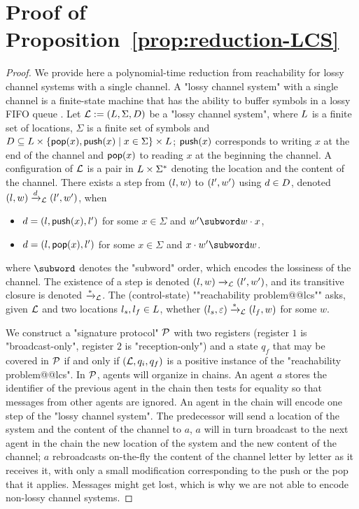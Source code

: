 \section{Proof of Proposition~\ref{prop:reduction-LCS}}
\label{app:reduction-lcs}

\propReductionLCS*
\begin{proof}
	We provide here a polynomial-time reduction from reachability for lossy channel systems with a single channel. A "lossy channel system" with a single channel is a finite-state machine that has the ability to buffer symbols in a lossy FIFO queue \cite{Schnoebelen2002verifying}. 
	Let $\mathcal{L} := (L,\Sigma, D)$ be a "lossy channel system", where $L$ is a finite set of locations, $\Sigma$ is a finite set of symbols and $D \subseteq L \times \{\mathsf{pop}(x), \mathsf{push}(x) \mid x \in \Sigma\} \times L$; $\mathsf{push}(x)$ corresponds to writing $x$ at the end of the channel and $\mathsf{pop}(x)$ to reading $x$ at the beginning the channel. A configuration of $\mathcal{L}$ is a pair in $L \times \Sigma^*$ denoting the location and the content of the channel. There exists a step from $(l,w)$ to $(l',w')$ using $d \in D$, denoted $(l,w) \xrightarrow{d}_{\mathcal{L}} (l',w')$, when
	\begin{itemize}
		\item $d = (l,\mathsf{push}(x),l')$ for some $x \in \Sigma$ and $w' \subword w \cdot x$,
		\item $d = (l,\mathsf{pop}(x),l')$ for some $x \in \Sigma$ and $x \cdot w' \subword w$.
	\end{itemize}
	where $\subword$ denotes the "subword" order, which encodes the lossiness of the channel. 
	The existence of a step is denoted $(l,w) \xrightarrow{}_{\mathcal{L}} (l',w')$, and its transitive closure is denoted $\xrightarrow{*}_{\mathcal{L}}$. The (control-state) ""reachability problem@@lcs"" asks, given $\mathcal{L}$ and two locations $l_s, l_f \in L$, whether $(l_s,\varepsilon) \xrightarrow{*}_{\mathcal{L}} (l_f, w)$ for some $w$. 
	
	We construct a "signature protocol" $\mathcal{P}$ with two registers (register $1$ is "broadcast-only", register $2$ is "reception-only") and a state $q_f$ that may be covered in $\mathcal{P}$ if and only if $(\mathcal{L}, q_i, q_f)$ is a positive instance of the "reachability problem@@lcs". 
	In $\mathcal{P}$, agents will organize in chains.
	An agent $a$ stores the identifier of the previous agent in the chain then tests for equality so that messages from other agents are ignored. An agent in the chain will encode one step of the "lossy channel system". 
	The predecessor will send a location of the system and the content of the channel to $a$, $a$ will in turn broadcast to the next agent in the chain the new location of the system and the new content of the channel; $a$ rebroadcasts on-the-fly the content of the channel letter by letter as it receives it, with only a small modification corresponding to the push or the pop that it applies. Messages might get lost, which is why we are not able to encode non-lossy channel systems.
	


\end{proof}
